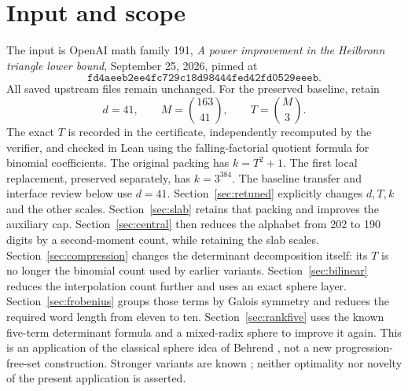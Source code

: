 \documentclass[11pt]{article}
\begin{document}
\section{Input and scope}
The input is OpenAI math family 191, \emph{A power improvement in the
Heilbronn triangle lower bound}, September 25, 2026, pinned at
\[
 \texttt{fd4aeeb2ee4fc729c18d98444fed42fd0529eeeb}.
\]
All saved upstream files remain unchanged. For the preserved baseline, retain
\[
 d=41,\qquad M=\binom{163}{41},\qquad T=\binom{M}{3}.
\]
The exact \(T\) is recorded in the certificate, independently
recomputed by the verifier, and checked in Lean using the
falling-factorial quotient formula for binomial coefficients.
The original packing has \(k=T^2+1\).
The first local replacement, preserved separately, has \(k=3^{384}\).
The baseline transfer and interface review below use \(d=41\).
Section~\ref{sec:retuned} explicitly changes \(d,T,k\) and the other scales.
Section~\ref{sec:slab} retains that packing and improves the auxiliary cap.
Section~\ref{sec:central} then reduces the alphabet from 202 to 190 digits
by a second-moment count, while retaining the slab scales.
Section~\ref{sec:compression} changes the determinant decomposition
itself: its \(T\) is no longer the binomial count used by earlier variants.
Section~\ref{sec:bilinear} reduces the interpolation count further and
uses an exact sphere layer.
Section~\ref{sec:frobenius} groups those terms by Galois symmetry and
reduces the required word length from eleven to ten.
Section~\ref{sec:rankfive} uses the known five-term determinant formula
\cite{krishna-makam} and a mixed-radix sphere to improve it again.
This is an application of the classical sphere idea of Behrend
\cite{behrend}, not a new progression-free-set construction.
Stronger variants are known \cite{ehps}; neither optimality nor
novelty of the present application is asserted.
\end{document}
